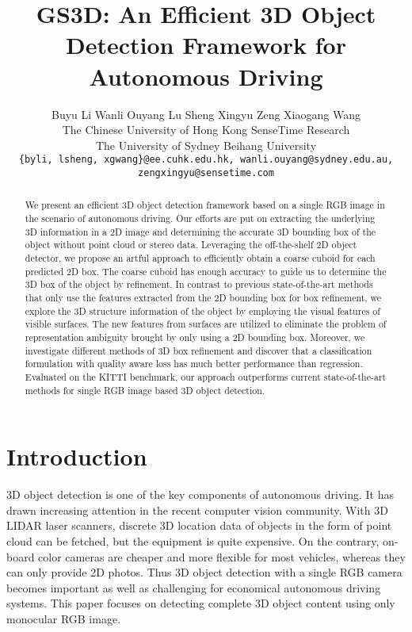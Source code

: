\documentclass[10pt,twocolumn,letterpaper]{article}
\begin{document}
\title{GS3D: An Efficient 3D Object Detection Framework for Autonomous Driving}

\author{
Buyu Li \quad Wanli Ouyang \quad Lu Sheng \quad Xingyu Zeng \quad Xiaogang Wang\\
The Chinese University of Hong Kong \quad SenseTime Research\\
The University of Sydney \quad Beihang University \\
{\tt\small \{byli, lsheng, xgwang\}@ee.cuhk.edu.hk, wanli.ouyang@sydney.edu.au, zengxingyu@sensetime.com}
}

\maketitle


\begin{abstract}
We present an efficient 3D object detection framework based on a single RGB image in the scenario of autonomous driving. Our efforts are put on extracting the underlying 3D information in a 2D image and determining the accurate 3D bounding box of the object without point cloud or stereo data. Leveraging the off-the-shelf 2D object detector, we propose an artful approach to efficiently obtain a coarse cuboid for each predicted 2D box. The coarse cuboid has enough accuracy to guide us to determine the 3D box of the object by refinement. In contrast to previous state-of-the-art methods that only use the features extracted from the 2D bounding box for box refinement, we explore the 3D structure information of the object by employing the visual features of visible surfaces. The new features from surfaces are utilized to eliminate the problem of representation ambiguity brought by only using a 2D bounding box. Moreover, we investigate different methods of 3D box refinement and discover that a classification formulation with quality aware loss has much better performance than regression. Evaluated on the KITTI benchmark, our approach outperforms current state-of-the-art methods for single RGB image based 3D object detection.
\end{abstract}

\section{Introduction}

3D object detection is one of the key components of autonomous driving. It has drawn increasing attention in the recent computer vision community.
With 3D LIDAR laser scanners, discrete 3D location data of objects in the form of point cloud can be fetched, but the equipment is quite expensive. On the contrary, on-board color cameras are cheaper and more flexible for most vehicles, whereas they can only provide 2D photos.
Thus 3D object detection with a single RGB camera becomes important as well as challenging for economical autonomous driving systems.
This paper focuses on detecting complete 3D object content using only monocular RGB image.
\end{document}
